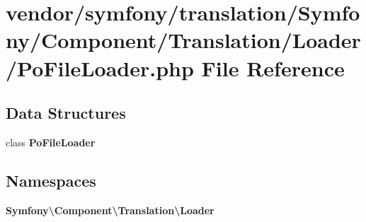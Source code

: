 \section{vendor/symfony/translation/\+Symfony/\+Component/\+Translation/\+Loader/\+Po\+File\+Loader.php File Reference}
\label{_po_file_loader_8php}
\subsection*{Data Structures}
\begin{DoxyCompactItemize}
\item 
class {\bf Po\+File\+Loader}
\end{DoxyCompactItemize}
\subsection*{Namespaces}
\begin{DoxyCompactItemize}
\item 
 {\bf Symfony\textbackslash{}\+Component\textbackslash{}\+Translation\textbackslash{}\+Loader}
\end{DoxyCompactItemize}
